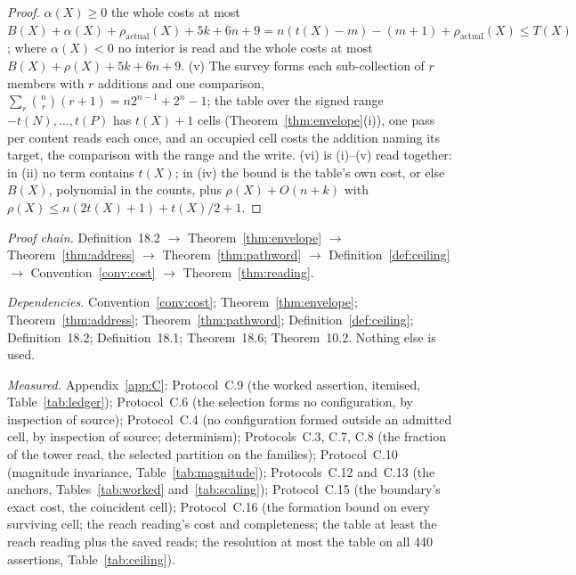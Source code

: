 \documentclass[pdflatex,sn-mathphys-num]{sn-jnl}
\theoremstyle{thmstyleone}%
\theoremstyle{thmstyletwo}%
\theoremstyle{thmstylethree}%
\newcommand{\deps}[1]{\par\begin{sloppypar}\noindent\emph{Dependencies.} #1 Nothing else is used.\end{sloppypar}}
\newcommand{\chain}[1]{\par\begin{sloppypar}\noindent\emph{Proof chain.} #1\end{sloppypar}}
\newcommand{\measured}[1]{\par\begin{sloppypar}\noindent\emph{Measured.} #1\end{sloppypar}}
\begin{document}
\begin{proof}
$\alpha(X)\ge0$ the whole costs at most $B(X)+\alpha(X)+\rho_{\mathrm{actual}}(X)+5k+6n+9=n(t(X)-m)-(m+1)+\rho_{\mathrm{actual}}(X)\le T(X)$; where $\alpha(X)<0$ no interior is read and the whole costs at most $B(X)+\rho(X)+5k+6n+9$. (v) The survey forms each sub-collection of $r$ members with $r$ additions and one comparison, $\sum_r\binom{n}{r}(r+1)=n2^{n-1}+2^n-1$; the table over the signed range $-t(N),\dots,t(P)$ has $t(X)+1$ cells (Theorem~\ref{thm:envelope}(i)), one pass per content reads each once, and an occupied cell costs the addition naming its target, the comparison with the range and the write. (vi) is (i)--(v) read together: in (ii) no term contains $t(X)$; in (iv) the bound is the table's own cost, or else $B(X)$, polynomial in the counts, plus $\rho(X)+O(n+k)$ with $\rho(X)\le n(2t(X)+1)+t(X)/2+1$.
\end{proof}
\chain{Definition~18.2 $\to$ Theorem~\ref{thm:envelope} $\to$ Theorem~\ref{thm:address} $\to$ Theorem~\ref{thm:pathword} $\to$ Definition~\ref{def:ceiling} $\to$ Convention~\ref{conv:cost} $\to$ Theorem~\ref{thm:reading}.}
\deps{Convention~\ref{conv:cost}; Theorem~\ref{thm:envelope}; Theorem~\ref{thm:address}; Theorem~\ref{thm:pathword}; Definition~\ref{def:ceiling}; Definition~18.2; Definition~18.1; Theorem~18.6; Theorem~10.2.}
\measured{Appendix~\ref{app:C}: Protocol~C.9 (the worked assertion, itemised, Table~\ref{tab:ledger}); Protocol~C.6 (the selection forms no configuration, by inspection of source); Protocol~C.4 (no configuration formed outside an admitted cell, by inspection of source; determinism); Protocols~C.3, C.7, C.8 (the fraction of the tower read, the selected partition on the families); Protocol~C.10 (magnitude invariance, Table~\ref{tab:magnitude}); Protocols~C.12 and~C.13 (the anchors, Tables~\ref{tab:worked} and~\ref{tab:scaling}); Protocol~C.15 (the boundary's exact cost, the coincident cell); Protocol~C.16 (the formation bound on every surviving cell; the reach reading's cost and completeness; the table at least the reach reading plus the saved reads; the resolution at most the table on all 440 assertions, Table~\ref{tab:ceiling}).}
\end{document}
